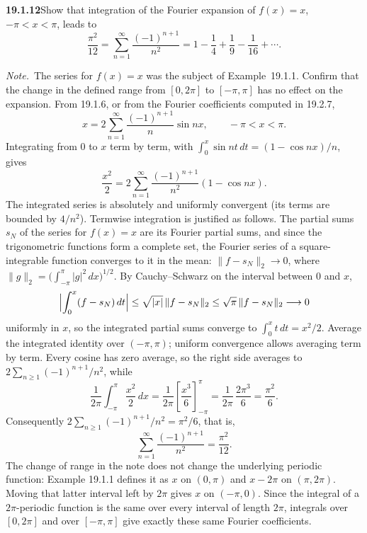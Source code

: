 \par\bigskip
\noindent\textbf{19.1.12}\quad Show that integration of the Fourier
expansion of $f(x)=x$, $-\pi<x<\pi$, leads to
\[
\frac{\pi^{2}}{12}=\sum_{n=1}^{\infty}\frac{(-1)^{n+1}}{n^{2}}
=1-\frac{1}{4}+\frac{1}{9}-\frac{1}{16}+\cdots.
\]
\par\emph{Note.}~The series for $f(x)=x$ was the subject of
Example~19.1.1. Confirm that the change in the defined range from
$[0,2\pi]$ to $[-\pi,\pi]$ has no effect on the expansion.
\solution
From 19.1.6, or from the Fourier coefficients computed in 19.2.7,
\[
x=2\sum_{n=1}^{\infty}\frac{(-1)^{n+1}}n\sin nx,
\qquad-\pi<x<\pi.
\]
Integrating from $0$ to $x$ term by term, with
$\int_0^x\sin nt\,dt=(1-\cos nx)/n$, gives
\[
\frac{x^2}{2}
=2\sum_{n=1}^{\infty}\frac{(-1)^{n+1}}{n^2}(1-\cos nx).
\]
The integrated series is absolutely and uniformly convergent (its terms
are bounded by $4/n^2$). Termwise integration is justified as follows.
The partial sums $s_N$ of the series for $f(x)=x$ are its Fourier
partial sums, and since the trigonometric functions form a complete set,
the Fourier series of a square-integrable function converges to it in
the mean: $\|f-s_N\|_2\to0$, where
$\|g\|_2=\bigl(\int_{-\pi}^{\pi}|g|^2\,dx\bigr)^{1/2}$. By Cauchy--Schwarz
on the interval between $0$ and $x$,
\[
\Bigl|\int_0^x(f-s_N)\,dt\Bigr|\le\sqrt{|x|}\,\|f-s_N\|_2
\le\sqrt{\pi}\,\|f-s_N\|_2\longrightarrow0
\]
uniformly in $x$, so the integrated partial sums converge to
$\int_0^xt\,dt=x^2/2$.
Average the integrated identity over $(-\pi,\pi)$; uniform convergence
allows averaging term by term. Every cosine has zero average, so the
right side averages to $2\sum_{n\ge1}(-1)^{n+1}/n^2$, while
\[
\frac1{2\pi}\int_{-\pi}^{\pi}\frac{x^2}{2}\,dx
=\frac1{2\pi}\left[\frac{x^3}{6}\right]_{-\pi}^{\pi}
=\frac1{2\pi}\,\frac{2\pi^3}{6}=\frac{\pi^2}{6}.
\]
Consequently $2\sum_{n\ge1}(-1)^{n+1}/n^2=\pi^2/6$, that is,
\[
\boxed{\sum_{n=1}^{\infty}\frac{(-1)^{n+1}}{n^2}=\frac{\pi^2}{12}.}
\]
The change of range in the note does not change the underlying periodic
function: Example 19.1.1 defines it as $x$ on $(0,\pi)$ and $x-2\pi$ on
$(\pi,2\pi)$. Moving that latter interval left by $2\pi$ gives $x$ on
$(-\pi,0)$. Since the integral of a $2\pi$-periodic function is the same
over every interval of length $2\pi$, integrals over $[0,2\pi]$ and over
$[-\pi,\pi]$ give exactly these same Fourier coefficients.

